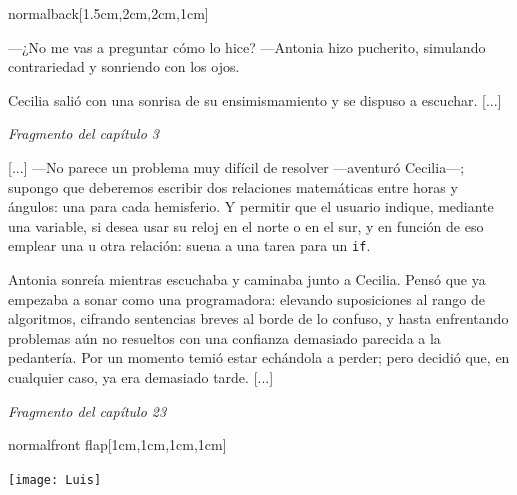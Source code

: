 \documentclass[coverwidth=148mm, coverheight=210mm, spinewidth=37mm,
flapwidth=7cm, wrapwidth=3mm, 11pt]{bookcover}
\begin{document}
\begin{bookcover}
\begin{bookcoverelement}{normal}{back}[1.5cm,2cm,2cm,1cm]
{      \hspace{.5em} ---¿No me vas a preguntar cómo lo hice? ---Antonia
      hizo pucherito, simulando contrariedad y sonriendo con los ojos.

      \hspace{.5em} Cecilia salió con una sonrisa de su
      ensimismamiento y se dispuso a escuchar. [...]
  

  \begin{flushright}
    \emph{Fragmento del capítulo 3}
  \end{flushright}

  \vspace{2.5em}
  
  \hspace{.5em} [...] ---No parece un problema muy difícil de resolver
  ---a\-ven\-tu\-ró Cecilia---; supongo que deberemos escribir dos
  relaciones matemáticas entre horas y ángulos: una para cada
  hemisferio. Y permitir que el usuario indique, mediante una
  variable, si desea usar su reloj en el norte o en el sur, y en
  función de eso emplear una u otra relación: suena a una tarea para
  un \texttt{if}.

  \hspace{.5em} Antonia sonreía mientras escuchaba y caminaba junto a
  Cecilia. Pensó que ya empezaba a sonar como una programadora:
  elevando suposiciones al rango de algoritmos, cifrando sentencias
  breves al borde de lo confuso, y hasta enfrentando problemas aún no
  resueltos con una confianza demasiado parecida a la pedantería. Por
  un momento temió estar echándola a perder; pero decidió que, en
  cualquier caso, ya era demasiado tarde. [...]

  \begin{flushright}
    \emph{Fragmento del capítulo 23}
  \end{flushright}
}
  
  \end{bookcoverelement}

  \begin{bookcoverelement}{normal}{front flap}[1cm,1cm,1cm,1cm]

    \begin{center}
      \texttt{[image: Luis]}
    \end{center}

    \medskip
    

\end{bookcoverelement}
\end{bookcover}
\end{document}

